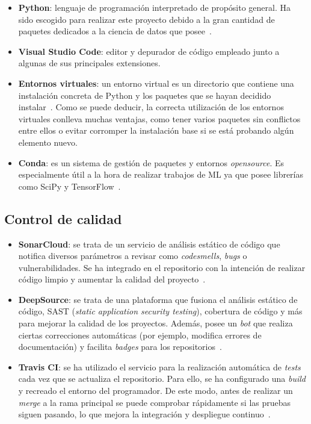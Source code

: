 \begin{itemize}
	\item \textbf{Python}: lenguaje de programación interpretado de propósito general. Ha sido escogido para realizar este proyecto debido a la gran cantidad de paquetes dedicados a la ciencia de datos que posee~\cite{python}.
	\item \textbf{Visual Studio Code}: editor y depurador de código empleado junto a algunas de sus principales extensiones.
	\item \textbf{Entornos virtuales}: un entorno virtual es un directorio que contiene una instalación concreta de Python y los paquetes que se hayan decidido instalar~\cite{venvs}. Como se puede deducir, la correcta utilización de los entornos virtuales conlleva muchas ventajas, como tener varios paquetes sin conflictos entre ellos o evitar corromper la instalación base si se está probando algún elemento nuevo.
	\item \textbf{Conda}: es un sistema de gestión de paquetes y entornos \textit{opensource}. Es especialmente útil a la hora de realizar trabajos de ML ya que posee librerías como SciPy y TensorFlow~\cite{conda}.
\end{itemize}

\subsection{Control de calidad}

\begin{itemize}
	\item \textbf{SonarCloud}: se trata de un servicio de análisis estático de código que notifica diversos parámetros a revisar como \textit{codesmells}, \textit{bugs} o vulnerabilidades. Se ha integrado en el repositorio con la intención de realizar código limpio y aumentar la calidad del proyecto~\cite{sonarCloud}.
	\item \textbf{DeepSource}: se trata de una plataforma que fusiona el análisis estático de código, SAST (\textit{static application security testing}), cobertura de código y más para mejorar la calidad de los proyectos. Además, posee un \textit{bot} que realiza ciertas correcciones automáticas (por ejemplo, modifica errores de documentación) y facilita \textit{badges} para los repositorios~\cite{deepSourceBot}.
	\item \textbf{Travis CI}: se ha utilizado el servicio para la realización automática de \textit{tests} cada vez que se actualiza el repositorio. Para ello, se ha configurado una \textit{build} y recreado el entorno del programador. De este modo, antes de realizar un \textit{merge} a la rama principal se puede comprobar rápidamente si las pruebas siguen pasando, lo que mejora la integración y despliegue continuo~\cite{travisCI}.
\end{itemize}

